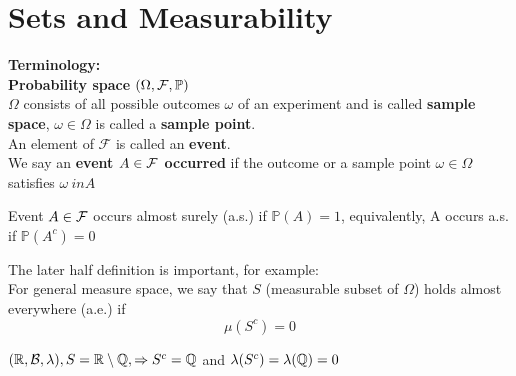 \newpage
\section{Sets and Measurability}
\textbf{Terminology:} \\[0.5cm]
\textbf{Probability space} $(\Omega, \mathcal{F}, \mathbb{P})$ \\
$\Omega$ consists of all possible outcomes $\omega$ of an experiment and is called \textbf{sample space}, $\omega \in \Omega$ is called a \textbf{sample point}. \\
An element of $\mathcal{F}$ is called an \textbf{event}. \\
We say an \textbf{event $A\in \mathcal{F}$ occurred} if the outcome or a sample point $\omega \in \Omega$ satisfies $\omega \ in A$
\begin{dfn}
Event $A \in \mathcal{F}$ occurs almost surely (a.s.) if $\mathbb{P}(A) = 1$, equivalently, A occurs a.s. if $\mathbb{P}(A^c) = 0$
\end{dfn} The later half definition is important, for example: \\[0.5cm]
For general measure space, we say that $S$ (measurable subset of $\Omega$) holds almost everywhere (a.e.) if 
\begin{equation*}
    \mu(S^c) = 0
\end{equation*}
\begin{example}
$(\mathbb{R}, \mathcal{B}, \lambda), S = \mathbb{R} \setminus \mathbb{Q},\Rightarrow S^c = \mathbb{Q}$ and $\lambda(S^c) = \lambda(\mathbb{Q}) = 0$
\end{example}
